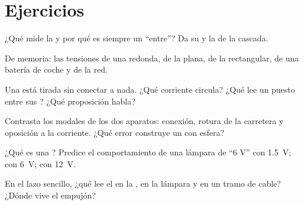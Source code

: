 \section{Ejercicios}

\begin{exercise}[$\star$]\label{exo:g8:voltage-voltmeter:1}
¿Qué mide la  y por qué es siempre un ``entre''?
Da su  y la  de la cascada.
\end{exercise}

\begin{exercise}[$\star$]\label{exo:g8:voltage-voltmeter:2}
De memoria: las tensiones de una  redonda, de la
 plana, de la  rectangular, de una
batería de coche y de la red.
\end{exercise}

\begin{exercise}[$\star$]\label{exo:g8:voltage-voltmeter:3}
Una  está tirada sin conectar a nada. ¿Qué corriente
circula? ¿Qué lee un  puesto entre sus ? ¿Qué
proposición habla?
\end{exercise}

\begin{exercise}[$\star$]\label{exo:g8:voltage-voltmeter:4}
Contrasta los modales de los dos aparatos: conexión, rotura de la
carretera y oposición a la corriente. ¿Qué error construye un
 con esfera?
\end{exercise}

\begin{exercise}[$\star$]\label{exo:g8:voltage-voltmeter:5}
¿Qué es una ? Predice el comportamiento de una
lámpara de ``6 V'' con \qty{1.5}{V}; con \qty{6}{V}; con
\qty{12}{V}.
\end{exercise}

\begin{exercise}[$\star$]\label{exo:g8:voltage-voltmeter:6}
En el lazo sencillo, ¿qué lee el  en la
, en la lámpara y en un tramo de cable? ¿Dónde vive el
empujón?
\end{exercise}

